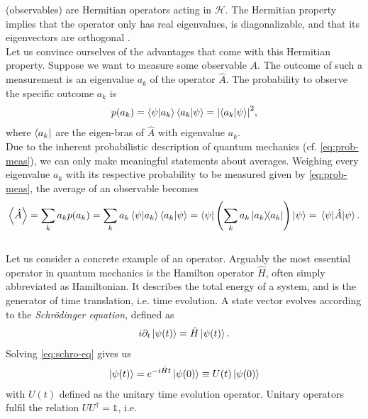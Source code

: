 (observables) are Hermitian operators acting in $\mathcal{H}$. 
The Hermitian property implies that the operator only has real eigenvalues, is diagonalizable,
and that its eigenvectors are orthogonal \cite{messiahQuantumMechanics1991}.\\
Let us convince ourselves of the advantages that come with this Hermitian property.
Suppose we want to measure some observable $A$.
The outcome of such a measurement is an eigenvalue $a_k$ of the operator $\hat{A}$. The probability to observe the specific outcome $a_k$ is
\begin{align}\label{eq:prob-meas}
    p(a_k) = \braket{\psi}{a_k}\braket{a_k}{\psi} = \abs{\braket{a_k}{\psi}}^2,
\end{align}
where $\bra{a_k}$ are the eigen-bras of $\hat{A}$ with eigenvalue $a_k$.\\
Due to the inherent probabilistic description of quantum mechanics (cf. \cref{eq:prob-meas}), we can only make meaningful statements about averages.
Weighing every eigenvalue $a_k$ with its respective probability to be measured
given by \cref{eq:prob-meas}, the average of an observable becomes
\cite{nielsenQuantumComputationQuantum2010}
\begin{align}
    \expval{\hat{A}} = \sum\limits_k a_k p(a_k) = \sum\limits_k a_k \braket{\psi}{a_k}\braket{a_k}{\psi}
    = \bra{\psi} \left(\sum\limits_k a_k \dyad{a_k}\right) \ket{\psi} = \ev{\hat{A}}{\psi}.
\end{align}\\
Let us consider a concrete example of an operator.
Arguably the most essential operator in quantum mechanics is the Hamilton operator $\hat{H}$, often simply abbreviated as Hamiltonian.
It describes the total energy of a system, and is the generator of time translation, i.e. time evolution. A state vector evolves
according to the \emph{Schrödinger equation}, defined as
\cite{messiahQuantumMechanics1991}
\begin{align}\label{eq:schro-eq}
    i\partial_t \ket{\psi(t)} = \hat{H} \ket{\psi(t)}.
\end{align}
Solving \cref{eq:schro-eq} gives us
\begin{align}\label{eq:schro-sol}
    \ket{\psi(t)} = e^{-i\hat{H}t}\ket{\psi(0)} \equiv U(t)\ket{\psi(0)}
\end{align}
with $U(t)$ defined as the unitary time evolution operator. Unitary operators fulfil the relation $UU^\dagger=\mathds{1}$, i.e.
